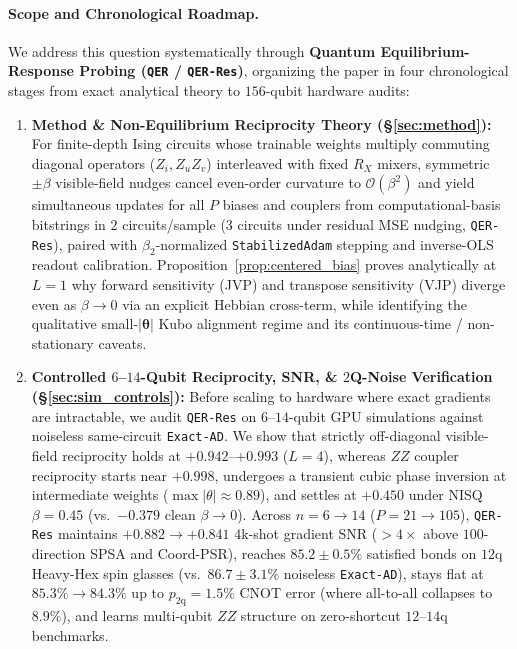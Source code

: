 \documentclass[11pt]{article}
\begin{document}
\paragraph{Scope and Chronological Roadmap.}
We address this question systematically through \textbf{Quantum Equilibrium-Response Probing (\texttt{QER} / \texttt{QER-Res})}, organizing the paper in four chronological stages from exact analytical theory to $156$-qubit hardware audits:
\begin{enumerate}[leftmargin=1.4em,itemsep=2pt,topsep=2pt]
  \item \textbf{Method \& Non-Equilibrium Reciprocity Theory (\S\ref{sec:method}):} For finite-depth Ising circuits whose trainable weights multiply commuting diagonal operators ($Z_i, Z_u Z_v$) interleaved with fixed $R_X$ mixers, symmetric $\pm\beta$ visible-field nudges cancel even-order curvature to $\mathcal{O}(\beta^2)$ and yield simultaneous updates for all $P$ biases and couplers from computational-basis bitstrings in $2$ circuits/sample ($3$ circuits under residual MSE nudging, \texttt{QER-Res}), paired with $\beta_2$-normalized \texttt{StabilizedAdam} stepping and inverse-OLS readout calibration. Proposition~\ref{prop:centered_bias} proves analytically at $L{=}1$ why forward sensitivity (JVP) and transpose sensitivity (VJP) diverge even as $\beta{\to}0$ via an explicit Hebbian cross-term, while identifying the qualitative small-$|\boldsymbol{\theta}|$ Kubo alignment regime and its continuous-time / non-stationary caveats.
  \item \textbf{Controlled $6$--$14$-Qubit Reciprocity, SNR, \& $2$Q-Noise Verification (\S\ref{sec:sim_controls}):} Before scaling to hardware where exact gradients are intractable, we audit \texttt{QER-Res} on $6$--$14$-qubit GPU simulations against noiseless same-circuit \texttt{Exact-AD}. We show that strictly off-diagonal visible-field reciprocity holds at $+0.942$--$+0.993$ ($L{=}4$), whereas $ZZ$ coupler reciprocity starts near $+0.998$, undergoes a transient cubic phase inversion at intermediate weights ($\max|\theta|{\approx}0.89$), and settles at $+0.450$ under NISQ $\beta{=}0.45$ (vs.\ $-0.379$ clean $\beta{\to}0$). Across $n{=}6{\to}14$ ($P{=}21{\to}105$), \texttt{QER-Res} maintains $+0.882{\to}+0.841$ $4\text{k}$-shot gradient SNR ($>4\times$ above $100$-direction SPSA and Coord-PSR), reaches $85.2\pm 0.5\%$ satisfied bonds on $12$q Heavy-Hex spin glasses (vs.\ $86.7\pm 3.1\%$ noiseless \texttt{Exact-AD}), stays flat at $85.3\%{\to}84.3\%$ up to $p_{2\text{q}}{=}1.5\%$ CNOT error (where all-to-all collapses to $8.9\%$), and learns multi-qubit $ZZ$ structure on zero-shortcut $12$--$14$q benchmarks.

\end{enumerate}
\end{document}
